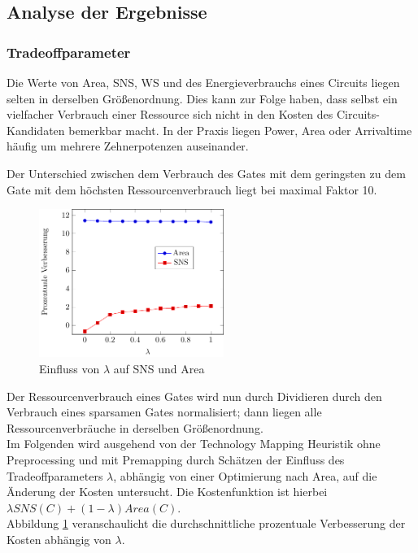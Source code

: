 \documentclass[11pt, a4paper, german]{article}
\newcommand{\TM}{Technology  Mapping }
\begin{document}
 
 \subsection{Analyse der Ergebnisse}
 \label{subsec:analyse_der_ergebnisse}

\subsubsection{Tradeoffparameter}
Die Werte von Area, SNS, WS und des Energieverbrauchs eines Circuits liegen selten in derselben Größenordnung. Dies kann zur Folge haben, dass selbst ein vielfacher Verbrauch einer Ressource sich nicht in den Kosten des Circuits-Kandidaten bemerkbar macht. In der Praxis liegen Power, Area oder Arrivaltime häufig um mehrere Zehnerpotenzen auseinander. 

Der Unterschied zwischen dem Verbrauch des Gates mit dem geringsten zu dem Gate mit dem höchsten Ressourcenverbrauch liegt bei maximal Faktor 10.

\begin{figure}
		\includegraphics[width = 6cm]{pictures/tex_files/analysis/tradeoff_curve}
		\caption{Einfluss von $\lambda$ auf SNS und Area}
		\label{bild:tradeoff_test}
\end{figure} 
Der Ressourcenverbrauch eines Gates wird nun durch Dividieren durch den Verbrauch eines sparsamen Gates normalisiert; dann liegen alle Ressourcenverbräuche  in derselben Gr\"o{\ss}enordnung. \\
Im Folgenden wird ausgehend von der \TM Heuristik ohne Preprocessing und mit Premapping durch Sch\"atzen der Einfluss des Tradeoffparameters $\lambda$, abhängig von einer Optimierung nach Area,  auf die Änderung der Kosten untersucht.  Die Kostenfunktion ist hierbei $\lambda SNS(C) + (1-\lambda)Area(C)$.\\
Abbildung \ref{bild:tradeoff_test} veranschaulicht die durchschnittliche prozentuale Verbesserung der Kosten abhängig von $\lambda$.\\
\end{document}
